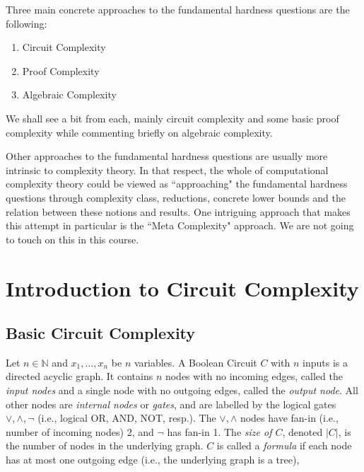 Three main concrete approaches to the fundamental hardness questions are the following:

\begin{enumerate}
\item  Circuit Complexity 
\item Proof Complexity 
\item Algebraic Complexity
\end{enumerate}

We shall see a bit from each, mainly circuit complexity and some basic proof complexity while commenting briefly on algebraic complexity. 



Other approaches to the fundamental hardness questions are usually more intrinsic to complexity theory. In that respect, the whole of computational complexity theory could be viewed as ``approaching" the fundamental hardness questions through complexity class, reductions, concrete lower bounds and the relation between these notions and results. One intriguing approach that makes this attempt in particular is the ``Meta Complexity" approach. We are not going to touch on this in this course. 



\chapter{Introduction to Circuit Complexity}
\label{intro} %
 

\section{Basic Circuit Complexity}
\label{sec:2}

\begin{definition}\label{def:boolean-circuit}
Let $n \in \mathbb{N}$ and $x_1, \ldots, x_n$ be $n$ variables. A Boolean Circuit $C$ with $n$ inputs is a directed acyclic graph. It contains $n$ nodes with no incoming edges, called the \emph{input nodes} and a single node with no outgoing edges, called the \emph{output node}.
All other nodes are \emph{internal nodes} or \emph{gates}, and
are labelled by the logical gates $\lor, \land,\neg$ (i.e., logical OR, AND, NOT, resp.). The $\lor,\land$ nodes have fan-in (i.e., number of incoming nodes) 2, and $\neg$ has fan-in 1. The \emph{size of $C$}, denoted $|C|$, is the number of nodes in the underlying graph.
$C$ is called a \emph{formula} if each node has at most one outgoing edge (i.e., the underlying graph is a tree),
\end{definition}




